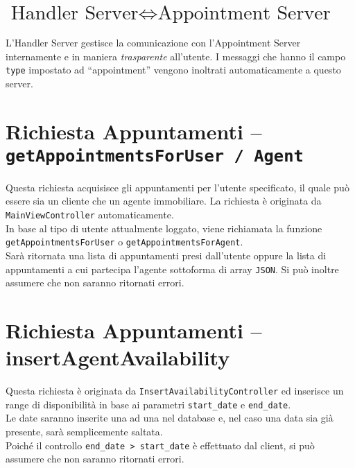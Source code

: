\section{$\text{Handler Server} \Leftrightarrow \text{Appointment Server}$}
\noindent L’Handler Server gestisce la comunicazione con l’Appointment Server internamente e in maniera \textit{trasparente} all’utente. I messaggi che hanno il campo \texttt{type} impostato ad “appointment” vengono inoltrati automaticamente a questo server.\\

\section{Richiesta Appuntamenti – \texttt{getAppointmentsForUser / Agent}}
\noindent Questa richiesta acquisisce gli appuntamenti per l’utente specificato, il quale può essere sia un cliente che un agente immobiliare. La richiesta è originata da \texttt{MainViewController} automaticamente.\\
In base al tipo di utente attualmente loggato, viene richiamata la funzione\\ \texttt{getAppointmentsForUser} o \texttt{getAppointmentsForAgent}.\\
Sarà ritornata una lista di appuntamenti presi dall’utente oppure la lista di appuntamenti a cui partecipa l’agente sottoforma di array \texttt{JSON}. Si può inoltre assumere che non saranno ritornati errori.

\section{Richiesta Appuntamenti – insertAgentAvailability}
\noindent Questa richiesta è originata da \texttt{InsertAvailabilityController} ed inserisce un range di disponibilità in base ai parametri \texttt{start\_date} e \texttt{end\_date}.\\
Le date saranno inserite una ad una nel database e, nel caso una data sia già presente, sarà semplicemente saltata.\\
Poiché il controllo \texttt{end\_date > start\_date} è effettuato dal client, si può assumere che non saranno ritornati errori.

